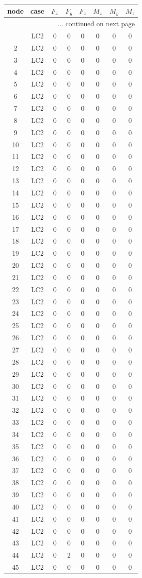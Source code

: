 \documentclass{article}%
\begin{document}
\begin{longtable}{| c c | c c c c c c |}%
\hline%
node&case&$F_x$&$F_y$&$F_z$&$M_x$&$M_y$&$M_z$\\%
\hline%
\endhead%
\hline%
\multicolumn{8}{r}{... continued on next page}\\%
\endfoot%
\hline%
\endlastfoot%
1&LC2&0&0&0&0&0&0\\%
2&LC2&0&0&0&0&0&0\\%
3&LC2&0&0&0&0&0&0\\%
4&LC2&0&0&0&0&0&0\\%
5&LC2&0&0&0&0&0&0\\%
6&LC2&0&0&0&0&0&0\\%
7&LC2&0&0&0&0&0&0\\%
8&LC2&0&0&0&0&0&0\\%
9&LC2&0&0&0&0&0&0\\%
10&LC2&0&0&0&0&0&0\\%
11&LC2&0&0&0&0&0&0\\%
12&LC2&0&0&0&0&0&0\\%
13&LC2&0&0&0&0&0&0\\%
14&LC2&0&0&0&0&0&0\\%
15&LC2&0&0&0&0&0&0\\%
16&LC2&0&0&0&0&0&0\\%
17&LC2&0&0&0&0&0&0\\%
18&LC2&0&0&0&0&0&0\\%
19&LC2&0&0&0&0&0&0\\%
20&LC2&0&0&0&0&0&0\\%
21&LC2&0&0&0&0&0&0\\%
22&LC2&0&0&0&0&0&0\\%
23&LC2&0&0&0&0&0&0\\%
24&LC2&0&0&0&0&0&0\\%
25&LC2&0&0&0&0&0&0\\%
26&LC2&0&0&0&0&0&0\\%
27&LC2&0&0&0&0&0&0\\%
28&LC2&0&0&0&0&0&0\\%
29&LC2&0&0&0&0&0&0\\%
30&LC2&0&0&0&0&0&0\\%
31&LC2&0&0&0&0&0&0\\%
32&LC2&0&0&0&0&0&0\\%
33&LC2&0&0&0&0&0&0\\%
34&LC2&0&0&0&0&0&0\\%
35&LC2&0&0&0&0&0&0\\%
36&LC2&0&0&0&0&0&0\\%
37&LC2&0&0&0&0&0&0\\%
38&LC2&0&0&0&0&0&0\\%
39&LC2&0&0&0&0&0&0\\%
40&LC2&0&0&0&0&0&0\\%
41&LC2&0&0&0&0&0&0\\%
42&LC2&0&0&0&0&0&0\\%
43&LC2&0&0&0&0&0&0\\%
44&LC2&0&2&0&0&0&0\\%
45&LC2&0&0&0&0&0&0\\%
\end{longtable}%
\end{document}

